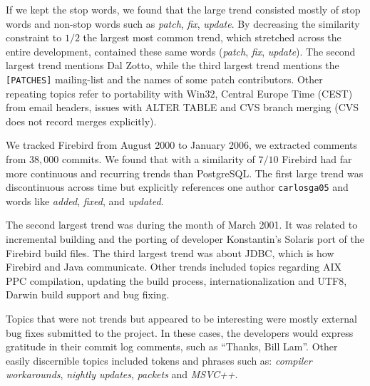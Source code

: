 \documentclass[times, 10pt,twocolumn]{article}
\newcommand{\shrinkit}{\vspace*{-.3em}}
\begin{document}
If we kept the stop words, we found that the large trend consisted
mostly of stop words and non-stop words such as \emph{patch},
\emph{fix}, \emph{update}.  By decreasing the similarity constraint to
$1/2$ the largest most common trend, which stretched across
the entire development, contained these same words (\emph{patch},
\emph{fix}, \emph{update}). The second largest trend mentions Dal
Zotto, while the third largest trend mentions the \texttt{[PATCHES]}
mailing-list and the names of some patch contributors.  Other repeating
topics refer to portability with Win32, Central Europe Time (CEST)
from email headers, issues with ALTER TABLE and CVS branch merging
(CVS does not record merges explicitly).


\shrinkit
{}
\shrinkit



We tracked Firebird from August 2000 to January 2006, we extracted comments from $38,000$ commits. We found that with a
similarity of $7/10$ Firebird had far more continuous and
recurring trends than PostgreSQL.  The first large trend was discontinuous
across time but explicitly references one author \texttt{carlosga05}
and words like \emph{added}, \emph{fixed}, and \emph{updated}.

The second largest trend was during the month of March 2001. It was
related to incremental building and the porting of developer
Konstantin's Solaris port of the Firebird build files. The third
largest trend was about JDBC, which is how Firebird and Java
communicate.  Other trends included topics regarding AIX PPC
compilation, updating the build process, internationalization and
UTF8, Darwin build support and bug fixing.

Topics that were not trends but appeared to be interesting were mostly
external bug fixes submitted to the project.  In these cases, the
developers would express gratitude in their commit log comments, such
as ``Thanks, Bill Lam''.  Other easily discernible topics included
tokens and phrases such as: \emph{compiler workarounds}, \emph{nightly
  updates}, \emph{packets} and \emph{MSVC++}.


\shrinkit
{}
\shrinkit

\label{sec:maxdb}

\end{document}

